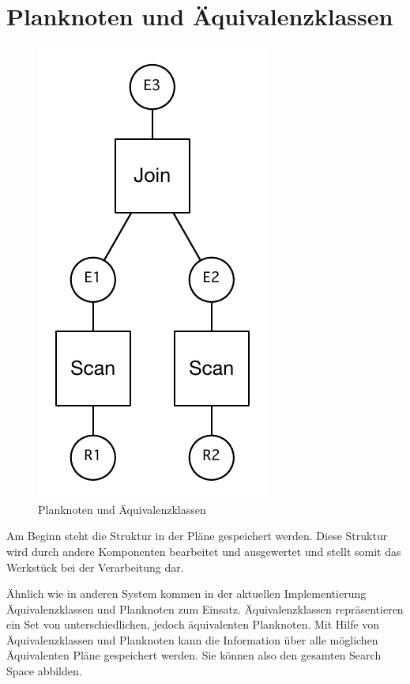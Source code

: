 \section{Planknoten und Äquivalenzklassen}





\begin{figure}[h]
  \centering
  \includegraphics{04_Implementierung/JoinScan.pdf}
  \caption{Planknoten und Äquivalenzklassen}
  \label{PlanAequi}
\end{figure}

Am Beginn steht die Struktur in der Pläne gespeichert werden. Diese Struktur wird durch andere Komponenten bearbeitet und ausgewertet und stellt somit das Werkstück bei der Verarbeitung dar.

Ähnlich wie in anderen System kommen in der aktuellen Implementierung Äquivalenzklassen und Planknoten zum Einsatz. Äquivalenzklassen repräsentieren ein Set von unterschiedlichen, jedoch äquivalenten Planknoten. Mit Hilfe von Äquivalenzklassen und Planknoten kann die Information über alle möglichen Äquivalenten Pläne gespeichert werden. Sie können also den gesamten Search Space abbilden.

